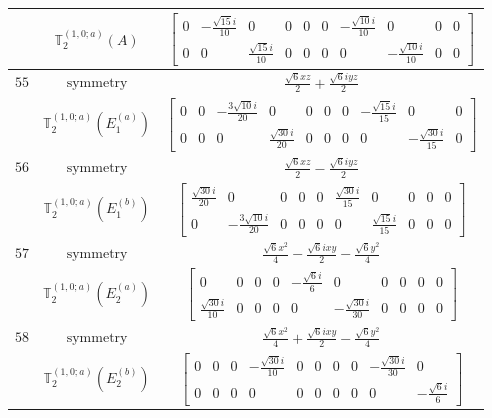 \documentclass[fleqn,8pt,landscape]{jsarticle}
\begin{document}
\begin{longtable}{ccc}
$  $ & $ \mathbb{T}_{2}^{(1,0;a)}(A) $ & $ \begin{bmatrix} 0 & - \frac{\sqrt{15} i}{10} & 0 & 0 & 0 & 0 & - \frac{\sqrt{10} i}{10} & 0 & 0 & 0 \\ 0 & 0 & \frac{\sqrt{15} i}{10} & 0 & 0 & 0 & 0 & - \frac{\sqrt{10} i}{10} & 0 & 0 \end{bmatrix} $ \\ \hline
$ 55 $ & $ \text{symmetry} $ & $ \frac{\sqrt{6} x z}{2} + \frac{\sqrt{6} i y z}{2} $ \\
$  $ & $ \mathbb{T}_{2}^{(1,0;a)}(E_{1}^{(a)}) $ & $ \begin{bmatrix} 0 & 0 & - \frac{3 \sqrt{10} i}{20} & 0 & 0 & 0 & 0 & - \frac{\sqrt{15} i}{15} & 0 & 0 \\ 0 & 0 & 0 & \frac{\sqrt{30} i}{20} & 0 & 0 & 0 & 0 & - \frac{\sqrt{30} i}{15} & 0 \end{bmatrix} $ \\ \hline
$ 56 $ & $ \text{symmetry} $ & $ \frac{\sqrt{6} x z}{2} - \frac{\sqrt{6} i y z}{2} $ \\
$  $ & $ \mathbb{T}_{2}^{(1,0;a)}(E_{1}^{(b)}) $ & $ \begin{bmatrix} \frac{\sqrt{30} i}{20} & 0 & 0 & 0 & 0 & \frac{\sqrt{30} i}{15} & 0 & 0 & 0 & 0 \\ 0 & - \frac{3 \sqrt{10} i}{20} & 0 & 0 & 0 & 0 & \frac{\sqrt{15} i}{15} & 0 & 0 & 0 \end{bmatrix} $ \\ \hline
$ 57 $ & $ \text{symmetry} $ & $ \frac{\sqrt{6} x^{2}}{4} - \frac{\sqrt{6} i x y}{2} - \frac{\sqrt{6} y^{2}}{4} $ \\
$  $ & $ \mathbb{T}_{2}^{(1,0;a)}(E_{2}^{(a)}) $ & $ \begin{bmatrix} 0 & 0 & 0 & 0 & - \frac{\sqrt{6} i}{6} & 0 & 0 & 0 & 0 & 0 \\ \frac{\sqrt{30} i}{10} & 0 & 0 & 0 & 0 & - \frac{\sqrt{30} i}{30} & 0 & 0 & 0 & 0 \end{bmatrix} $ \\ \hline
$ 58 $ & $ \text{symmetry} $ & $ \frac{\sqrt{6} x^{2}}{4} + \frac{\sqrt{6} i x y}{2} - \frac{\sqrt{6} y^{2}}{4} $ \\
$  $ & $ \mathbb{T}_{2}^{(1,0;a)}(E_{2}^{(b)}) $ & $ \begin{bmatrix} 0 & 0 & 0 & - \frac{\sqrt{30} i}{10} & 0 & 0 & 0 & 0 & - \frac{\sqrt{30} i}{30} & 0 \\ 0 & 0 & 0 & 0 & 0 & 0 & 0 & 0 & 0 & - \frac{\sqrt{6} i}{6} \end{bmatrix} $ \\ \hline

\end{longtable}
\end{document}
